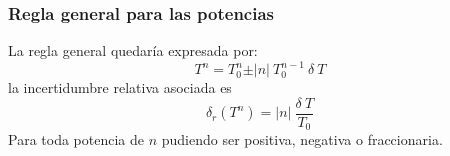 \begin{frame}
\frametitle{Regla general para las potencias}
La regla general quedaría expresada por:
\[ T^{n} = T_{0}^{n} \pm \vert n \vert \: T_{0}^{n-1} \: \delta \: T \]
la incertidumbre relativa asociada es
\[ \delta_{r} (T^{n}) = \vert n \vert \: \dfrac{\delta \: T}{T_{0}} \]
Para toda potencia de $n$ pudiendo ser positiva, negativa o fraccionaria.
\end{frame}

